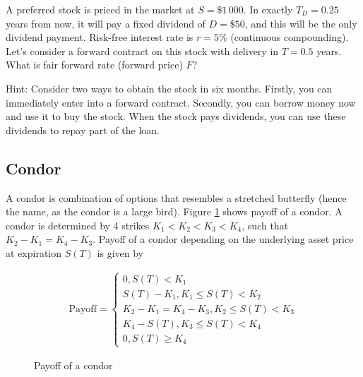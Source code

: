 \documentclass[a4paper,14pt]{extarticle}
\begin{document}
A preferred stock is priced in the market at $S=\$1\,000$. In exactly $T_D=0.25$ years from now, it will pay a fixed dividend of $D=\$50$, and this will be the only dividend payment. Risk-free interest rate is $r=5\%$ (continuous compounding). Let's consider a forward contract on this stock with delivery in $T=0.5$ years. What is fair forward rate (forward price) $F$?

Hint: Consider two ways to obtain the stock in six months. Firstly, you can immediately enter into a forward contract. Secondly, you can borrow money now and use it to buy the stock. When the stock pays dividends, you can use these dividends to repay part of the loan.

\subsection{Condor}

A condor is combination of options that resembles a stretched butterfly (hence the name, as the condor is a large bird). Figure \ref{condor_payoff} shows payoff of a condor. A condor is determined by 4 strikes $K_1<K_2<K_3<K_4$, such that $K_2-K_1 = K_4-K_3$. Payoff of a condor depending on the underlying asset price at expiration $S(T)$ is given by

\begin{align*}
\text{Payoff} = \begin{cases}
0, S(T) < K_1\\
S(T) - K_1, K_1 \le S(T) < K_2 \\
K_2-K_1 = K_4-K_3, K_2 \le S(T) < K_3 \\
K_4-S(T), K_3 \le S(T) < K_4\\
0, S(T) \ge K_4
\end{cases}
\end{align*}

\begin{figure}[h]
\centering
{}
\caption{Payoff of a condor}
\label{condor_payoff}
\end{figure}
\end{document}
